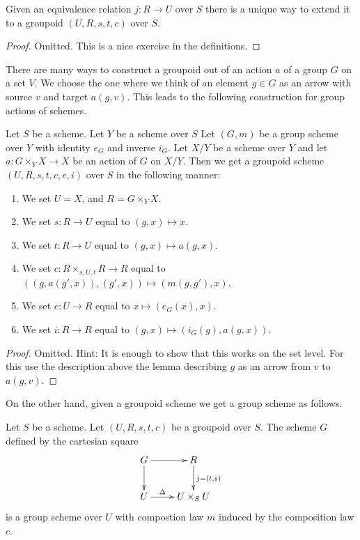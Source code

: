 \begin{lemma}
\label{lemma-equivalence-groupoid}
Given an equivalence relation $j : R \to U$ over $S$
there is a unique way to extend it to a groupoid
$(U, R, s, t, c)$ over $S$.
\end{lemma}

\begin{proof}
Omitted.
This is a nice exercise in the definitions.
\end{proof}

\noindent
There are many ways to construct a groupoid out of an action $a$
of a group $G$ on a set $V$. We choose the one where we think
of an element $g \in G$ as an arrow with source $v$ and target $a(g, v)$.
This leads to the following construction for group actions of
schemes.

\begin{lemma}
\label{lemma-groupoid-from-action}
Let $S$ be a scheme.
Let $Y$ be a scheme over $S$
Let $(G, m)$ be a group scheme over $Y$ with
identity $e_G$ and inverse $i_G$.
Let $X/Y$ be a scheme over $Y$ and let $a : G \times_Y X \to X$
be an action of $G$ on $X/Y$.
Then we get a groupoid scheme $(U, R, s, t, c, e, i)$ over $S$
in the following manner:
\begin{enumerate}
\item We set $U = X$, and $R = G \times_Y X$.
\item We set $s : R \to U$ equal to $(g, x) \mapsto x$.
\item We set $t : R \to U$ equal to $(g, x) \mapsto a(g, x)$.
\item We set $c : R \times_{s, U, t} R \to R$ equal to
$((g, a(g', x)), (g', x)) \mapsto (m(g, g'), x)$.
\item We set $e : U \to R$ equal to $x \mapsto (e_G(x), x)$.
\item We set $i : R \to R$ equal to $(g, x) \mapsto (i_G(g), a(g, x))$.
\end{enumerate}
\end{lemma}

\begin{proof}
Omitted. Hint: It is enough to show that this works on the set
level. For this use the description above the lemma describing
$g$ as an arrow from $v$ to $a(g, v)$.
\end{proof}

\noindent
On the other hand, given a groupoid scheme we get a group scheme as
follows.

\begin{lemma}
\label{lemma-groupoid-stabilizer}
Let $S$ be a scheme.
Let $(U, R, s, t, c)$ be a groupoid over $S$.
The scheme $G$ defined by the cartesian square
$$
\xymatrix{
G \ar[r] \ar[d] & R \ar[d]^{j = (t, s)} \\
U \ar[r]^-{\Delta} & U \times_S U
}
$$
is a group scheme over $U$ with compostion law
$m$ induced by the composition law $c$.
\end{lemma}

